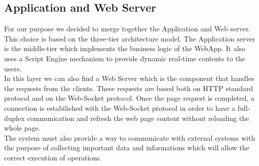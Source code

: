 \documentclass[numbers=noenddot, 12pt, a4paper, oneside]{scrbook}
\begin{document}
\subsection*{Application and Web Server}

For our purpose we decided to merge together the Application and Web server. This choice is based on the three-tier architecture model. The Application server is the middle-tier which implements the business logic of the WebApp. It also uses a Script Engine mechanism to provide dynamic real-time contents to the users.\\

In this layer we can also find a Web Server which is the component that handles the requests from the clients. These requests are based both on HTTP standard protocol and on the Web-Socket protocol. Once the page request is completed, a connection is estabilished with the Web-Socket protocol in order to have a full-duplex communication and refresh the web page content without reloading the whole page.\\

The system must also provide a way to communicate with external systems with the purpose of collecting important data and informations which will allow the correct execution of operations.\\
\end{document}
